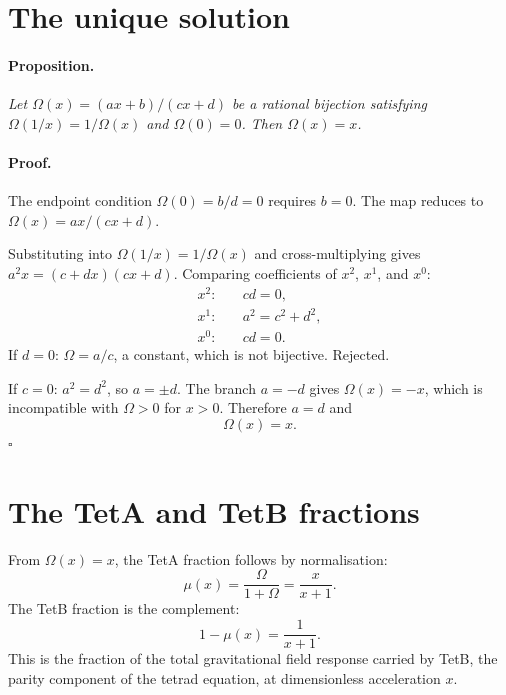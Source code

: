 \documentclass[twocolumn]{iopjournal}
\begin{document}

\section*{The unique solution}

\paragraph{Proposition.} \textit{Let
$\Omega(x) = (ax+b)/(cx+d)$ be a rational bijection
satisfying $\Omega(1/x) = 1/\Omega(x)$ and $\Omega(0) = 0$.
Then $\Omega(x) = x$.}

\paragraph{Proof.}
The endpoint condition $\Omega(0) = b/d = 0$ requires $b = 0$.
The map reduces to $\Omega(x) = ax/(cx + d)$.

Substituting into $\Omega(1/x) = 1/\Omega(x)$ and
cross-multiplying gives $a^2 x = (c + dx)(cx + d)$.
Comparing coefficients of $x^2$, $x^1$, and $x^0$:
\begin{align}
  x^2: \quad & cd = 0, \label{eq:x2} \\
  x^1: \quad & a^2 = c^2 + d^2, \label{eq:x1} \\
  x^0: \quad & cd = 0. \label{eq:x0}
\end{align}
If $d = 0$: $\Omega = a/c$, a constant, which is not
bijective. Rejected.

If $c = 0$: $a^2 = d^2$, so $a = \pm d$. The branch
$a = -d$ gives $\Omega(x) = -x$, which is incompatible
with $\Omega > 0$ for $x > 0$. Therefore $a = d$ and
\begin{equation}
  \Omega(x) = x.
  \label{eq:omega_result}
\end{equation}
\hfill$\square$


\section*{The TetA and TetB fractions}

From $\Omega(x) = x$, the TetA fraction follows by
normalisation:
\begin{equation}
  \mu(x) = \frac{\Omega}{1 + \Omega} = \frac{x}{x + 1}.
  \label{eq:mu}
\end{equation}
The TetB fraction is the complement:
\begin{equation}
  \boxed{1 - \mu(x) = \frac{1}{x + 1}.}
  \label{eq:tetb_result}
\end{equation}
This is the fraction of the total gravitational field
response carried by TetB, the parity component of the
tetrad equation, at dimensionless acceleration $x$.
\end{document}
